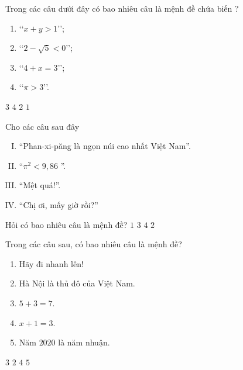 \begin{ex}%
	Trong các câu dưới đây có bao nhiêu  câu là mệnh đề chứa biến ?
	\begin{enumerate}
		\item  \lq\lq $ x+y>1 $\rq\rq;
		\item \lq\lq$2-\sqrt{5}<0$\rq\rq; 
		\item  \lq\lq$4+x=3$\rq\rq;
		\item \lq\lq$\pi >3$\rq\rq. 
	\end{enumerate}
	\choice 
		 {$3$}
		 {$4$}
		 {\True $2$}
		 {$1$}
\end{ex}

\begin{ex}%
	Cho các câu sau đây 
	\begin{enumerate}[(I)]
		\item “Phan-xi-păng là ngọn núi cao nhất Việt  Nam”.
		\item  “$\pi^2<9,86$ ”.
		 \item “Mệt quá!”.
		\item “Chị ơi,  mấy giờ rồi?”
	\end{enumerate}
	Hỏi có bao nhiêu câu  là mệnh đề?
	 \choice
		{$1$} 
		{$3$} 
		 {$4$}
		{\True  $2$}
\end{ex}

\begin{ex}%
	Trong các câu sau, có bao nhiêu câu là  mệnh đề?
	\begin{enumerate}
		 \item Hãy đi nhanh lên!
		\item Hà Nội  là thủ đô của Việt Nam.
		\item  $5+3=7$.
		\item $x+1=3$. 
		\item Năm $2020$ là  năm nhuận.
	\end{enumerate}
	\choice 
		{\True $3$} 
		{$2$} 
		{$4$} 
		 {$5$}
\end{ex}

